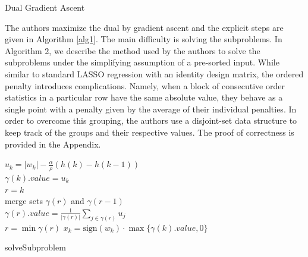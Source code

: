 \documentclass{uwstat572}
\theoremstyle{remark}
\theoremstyle{definition}
\begin{document}
\begin{algorithm}[!htp]
\caption{Dual Gradient Ascent}\label{alg1}
\end{algorithm}

The authors maximize the dual by gradient ascent and the explicit steps are given in Algorithm \ref{alg1}.  The main difficulty is solving the subproblems. In Algorithm 2, we describe the method used by the authors to solve the subproblems under the simplifying assumption of a pre-sorted input.  While similar to standard LASSO regression with an identity design matrix, the ordered penalty introduces complications.  Namely, when a block of consecutive order statistics in a particular row have the same absolute value, they behave as a single point with a penalty given by the average of their individual penalties.  In order to overcome this grouping, the authors use a disjoint-set data structure to keep track of the groups and their respective values. The proof of correctness is provided in the Appendix.

\begin{algorithm}[!htp]
    {
        $u_k = |w_k| - \frac{\alpha}{\rho} (h(k) - h(k-1))$
        \\
        $\gamma(k).value = u_k$
        \\
        $r = k$
        \\
            {
                merge sets $\gamma(r)$ and $\gamma(r-1)$
                \\
                $\gamma(r).value = \frac{1}{|\gamma(r)|} \sum_{j \in \gamma(r)} u_j$
                \\
                $r = \min \gamma(r)$
        }
    }
    {
        $x_k = {\text{sign}}(w_k) \cdot \max\{\gamma(k).value,0\}$
    }
    \caption{solveSubproblem}\label{alg2}
\end{algorithm}
\end{document}
